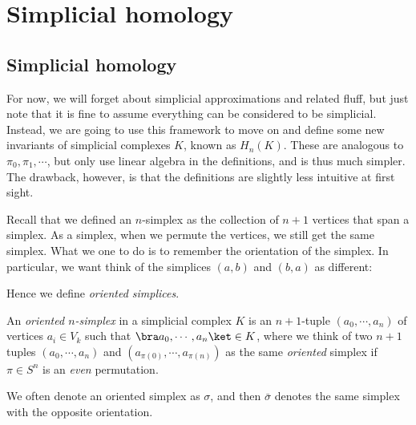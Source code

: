 \documentclass[a4paper]{article}
\begin{document}
\section{Simplicial homology}
\subsection{Simplicial homology}
For now, we will forget about simplicial approximations and related fluff, but just note that it is fine to assume everything can be considered to be simplicial. Instead, we are going to use this framework to move on and define some new invariants of simplicial complexes $K$, known as $H_n(K)$. These are analogous to $\pi_0, \pi_1, \cdots$, but only use linear algebra in the definitions, and is thus much simpler. The drawback, however, is that the definitions are slightly less intuitive at first sight.

Recall that we defined an $n$-simplex as the collection of $n + 1$ vertices that span a simplex. As a simplex, when we permute the vertices, we still get the same simplex. What we one to do is to remember the orientation of the simplex. In particular, we want think of the simplices $(a, b)$ and $(b, a)$ as different:
\begin{center}
\end{center}
Hence we define \emph{oriented simplices}.

\begin{defi}
  An \emph{oriented $n$-simplex} in a simplicial complex $K$ is an $n + 1$-tuple $(a_0, \cdots, a_n)$ of vertices $a_i \in V_k$ such that $\bra a_0, \cdots, a_n\ket \in K$, where we think of two $n + 1$ tuples $(a_0, \cdots, a_n)$ and $(a_{\pi(0)}, \cdots, a_{\pi(n)})$ as the same \emph{oriented} simplex if $\pi \in S^n$ is an \emph{even} permutation.

  We often denote an oriented simplex as $\sigma$, and then $\bar{\sigma}$ denotes the same simplex with the opposite orientation.
\end{defi}
\end{document}
